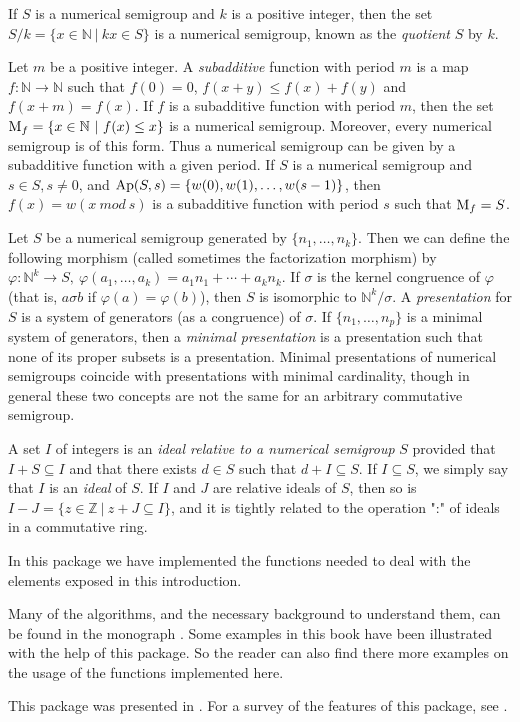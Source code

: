 \documentclass[a4paper,11pt]{report}
\begin{document}
{ If $S$ is a numerical semigroup and $k$ is a positive integer, then the set $S/k=\{ x\in {\mathbb N} \ |\ kx\in S\}$ is a numerical semigroup, known as the \emph{quotient} $S$ by $k$. 

 Let $m$ be a positive integer. A \label{llab2}\emph{subadditive} function with period $m$ is a map $f:{\mathbb N}\to {\mathbb N}$ such that $ f(0)=0$, $f(x+y)\leq f(x)+f(y)$ and $f(x+m)=f(x)$. If $f$ is a subadditive function with period $m$, then the set ${\rm M}_f=\{ x\in {\mathbb N}\ |\ f(x)\leq x\}$ is a numerical semigroup. Moreover, every numerical semigroup is of this form.
Thus a numerical semigroup can be given by a subadditive function with a given
period. If $S$ is a numerical semigroup and $s\in S, s\not=0$, and ${\rm Ap}(S,s)=\{ w(0),w(1),\ldots, w(s-1)\}$, then $f(x)=w(x \ mod\ s)$ is a subadditive function with period $s$ such that ${\rm M}_f=S$. 

 Let $S$ be a numerical semigroup generated by $\{n_1,\ldots,n_k\}$. Then we can define the following morphism (called sometimes the
factorization morphism) by $\varphi: {\mathbb N}^k \to S,\ \varphi(a_1,\ldots,a_k)=a_1n_1+\cdots+a_kn_k$. If $\sigma$ is the kernel congruence of $\varphi$ (that is, $a\sigma b$ if $\varphi(a)=\varphi(b)$), then $S$ is isomorphic to ${\mathbb N}^k/\sigma$. A \emph{presentation} for $S$ is a system of generators (as a congruence) of $\sigma$. If $\{n_1,\ldots,n_p\}$ is a minimal system of generators, then a \emph{minimal presentation} is a presentation such that none of its proper subsets is a presentation.
Minimal presentations of numerical semigroups coincide with presentations with
minimal cardinality, though in general these two concepts are not the same for
an arbitrary commutative semigroup. 

 A set $I$ of integers is an \emph{ideal relative to a numerical semigroup} $S$ provided that $I+S\subseteq I$ and that there exists $d\in S$ such that $d+I\subseteq S$. If $I\subseteq S$, we simply say that $I$ is an \emph{ideal} of $S$. If $I$ and $J$ are relative ideals of $S$, then so is $I-J=\{z\in {\mathbb Z}\ |\ z+J\subseteq I\}$, and it is tightly related to the operation ":" of ideals in a commutative
ring. 

 In this package we have implemented the functions needed to deal with the
elements exposed in this introduction. 

 Many of the algorithms, and the necessary background to understand them, can
be found in the monograph \cite{RGbook}. Some examples in this book have been illustrated with the help of this
package. So the reader can also find there more examples on the usage of the
functions implemented here. 

 This package was presented in \cite{JMDA}. For a survey of the features of this package, see \cite{MR3493240}. }
\end{document}
